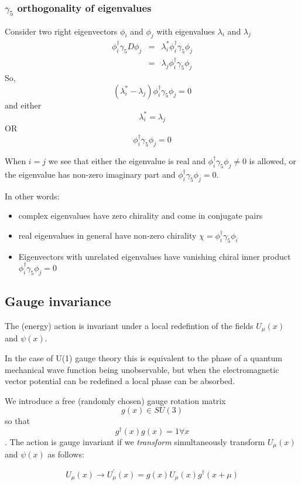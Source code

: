 \documentclass[letter,10pt]{report}
\begin{document}
\subsubsection{$\gamma_5$ orthogonality of eigenvalues}

Consider two right eigenvectors $\phi_i$ and $\phi_j$ with eigenvalues $\lambda_i$ and $\lambda_j$
\begin{eqnarray}
  \phi_i^\dagger \gamma_5 D \phi_j &=& \lambda_i^\ast \phi_i^\dagger \gamma_5 \phi_j\\
  &=& \lambda_j \phi_i^\dagger \gamma_5 \phi_j
\end{eqnarray}
So,
$$
(\lambda_i^\ast - \lambda_j)   \phi_i^\dagger \gamma_5 \phi_j = 0
$$
and either
$$
\lambda_i^\ast = \lambda_j 
$$
OR
$$
\phi_i^\dagger \gamma_5  \phi_j = 0
$$

When $i=j$ we see that either the eigenvalue is real and $\phi_i^\dagger \gamma_5 \phi_j \ne 0$ is allowed,
or the eigenvalue has non-zero imaginary part and $\phi_i^\dagger \gamma_5 \phi_j = 0$.

In other words:
\begin{itemize}
\item complex eigenvalues have zero chirality and come in conjugate pairs
\item real eigenvalues in general have non-zero chirality $\chi = \phi_i^\dagger \gamma_5 \phi_i$
\item Eigenvectors with unrelated eigenvalues have vanishing chiral inner product $\phi_i^\dagger \gamma_5 \phi_j = 0$
\end{itemize}

\subsection{Gauge invariance}

The (energy) action is invariant under a local redefintion of the fields $U_\mu(x)$ and $\psi(x)$.

In the case of U(1) gauge theory this is equivalent to the phase of a quantum mechanical wave function being unobservable,
but when the electromagnetic vector potential can be redefined a local phase can be absorbed.

We introduce a free (randomly chosen) gauge rotation matrix $$g(x) \in SU(3)$$ so that $$ g^\dagger(x) g(x) = 1 \forall x$$.
The action is gauge invariant if we \emph{transform} simultaneously transform $U_\mu(x)$ and $\psi(x)$ as follows:

$$U_\mu(x) \to U_\mu^\prime(x) = g(x) U_\mu(x) g^\dagger(x+\mu)$$
\end{document}
